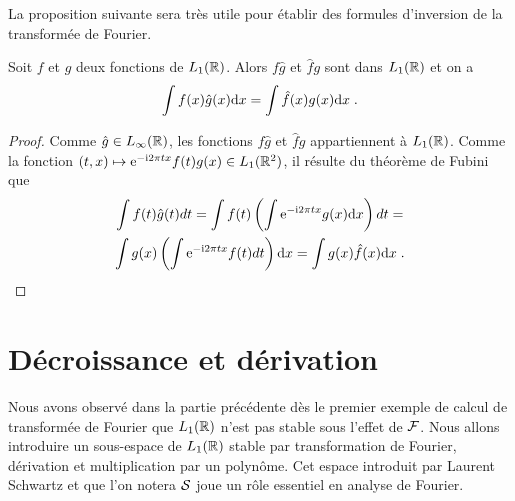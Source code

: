 La proposition suivante sera tr{\`e}s utile pour {\'e}tablir des formules d'inversion de la transform{\'e}e de Fourier.
\begin{proposition}
\label{prop:echangeTF}
Soit $f$ et $g$ deux fonctions de $L_1(\mathbb{R})$. Alors $f \hat{g}$ et $\hat{f}g$ sont dans $L_1(\mathbb{R})$ et on a
\begin{equation}
\label{eq:echange}
\int f(x) \hat{g}(x) \mathrm{d} x = \int \hat{f}(x) g(x) \mathrm{d} x \;.
\end{equation}
\end{proposition}
\begin{proof}
Comme $\hat{g} \in L_\infty(\mathbb{R})$, les fonctions $f \hat{g}$ et
$\hat{f} g$ appartiennent {\`a} $L_1(\mathbb{R})$. Comme la fonction $(t,x)
\mapsto \mathrm{e}^{- \mathrm{i} 2 \pi t x} f(t) g(x) \in L_1(\mathbb{R}^2)$, il
r{\'e}sulte du th{\'e}or{\`e}me de Fubini que
\begin{multline*}
\int f(t) \hat{g}(t) dt = \int f(t) \left( \int \mathrm{e}^{- \mathrm{i} 2 \pi t x} g(x) \mathrm{d} x \right) dt =
\\ \int g(x) \left( \int \mathrm{e}^{- \mathrm{i} 2 \pi t x} f(t) dt \right) \mathrm{d} x = \int g(x) \hat{f}(x) \mathrm{d} x\;.
\end{multline*}
\end{proof}


\section{D{\'e}croissance et d{\'e}rivation}
Nous avons observ{\'e} dans la partie pr{\'e}c{\'e}dente d{\`e}s le premier exemple de calcul de transform{\'e}e de Fourier
que $L_1(\mathbb{R})$  n'est pas stable sous l'effet de $\mathcal{F}$.
Nous allons introduire un sous-espace de $L_1(\mathbb{R})$ stable par transformation de Fourier,
d{\'e}rivation et multiplication par un polyn{\^o}me. Cet espace introduit par Laurent Schwartz et que l'on notera $\mathcal{S}$ joue un r\^ole essentiel en analyse de Fourier.


